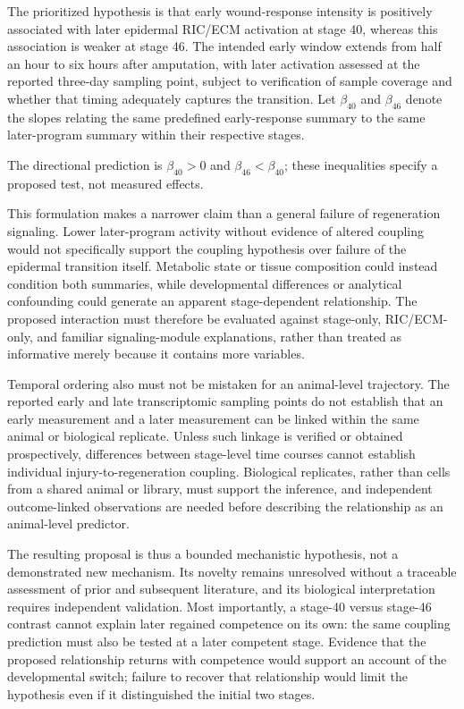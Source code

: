 \documentclass[11pt]{article}
\begin{document}
The prioritized hypothesis is that early wound-response intensity is positively associated with later epidermal RIC/ECM activation at stage 40, whereas this association is weaker at stage 46. The intended early window extends from half an hour to six hours after amputation, with later activation assessed at the reported three-day sampling point, subject to verification of sample coverage and whether that timing adequately captures the transition. Let $\beta_{40}$ and $\beta_{46}$ denote the slopes relating the same predefined early-response summary to the same later-program summary within their respective stages.

The directional prediction is $\beta_{40}>0$ and $\beta_{46}<\beta_{40}$; these inequalities specify a proposed test, not measured effects.

This formulation makes a narrower claim than a general failure of regeneration signaling. Lower later-program activity without evidence of altered coupling would not specifically support the coupling hypothesis over failure of the epidermal transition itself. Metabolic state or tissue composition could instead condition both summaries, while developmental differences or analytical confounding could generate an apparent stage-dependent relationship. The proposed interaction must therefore be evaluated against stage-only, RIC/ECM-only, and familiar signaling-module explanations, rather than treated as informative merely because it contains more variables.

Temporal ordering also must not be mistaken for an animal-level trajectory. The reported early and late transcriptomic sampling points do not establish that an early measurement and a later measurement can be linked within the same animal or biological replicate. Unless such linkage is verified or obtained prospectively, differences between stage-level time courses cannot establish individual injury-to-regeneration coupling. Biological replicates, rather than cells from a shared animal or library, must support the inference, and independent outcome-linked observations are needed before describing the relationship as an animal-level predictor.

The resulting proposal is thus a bounded mechanistic hypothesis, not a demonstrated new mechanism. Its novelty remains unresolved without a traceable assessment of prior and subsequent literature, and its biological interpretation requires independent validation. Most importantly, a stage-40 versus stage-46 contrast cannot explain later regained competence on its own: the same coupling prediction must also be tested at a later competent stage. Evidence that the proposed relationship returns with competence would support an account of the developmental switch; failure to recover that relationship would limit the hypothesis even if it distinguished the initial two stages.
\end{document}
